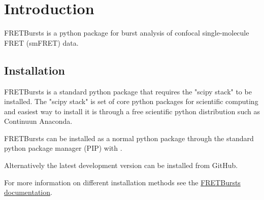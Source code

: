\section{Introduction}

FRETBursts is a python package for burst analysis of confocal single-molecule FRET (smFRET) data.

\subsection{Installation}
FRETBursts is a standard python package that requires the "scipy stack" to be installed.
The "scipy stack" is set of core python packages for scientific computing and easiest way to install it is through a free scientific python distribution such as Continuun Anaconda.

FRETBursts can be installed as a normal python package through the standard python package manager (PIP) with 
.

Alternatively the latest development version can be installed from GitHub.

For more information on different installation methods see the \href{http://fretbursts.readthedocs.org/installation.html#installation}{FRETBursts documentation}.

